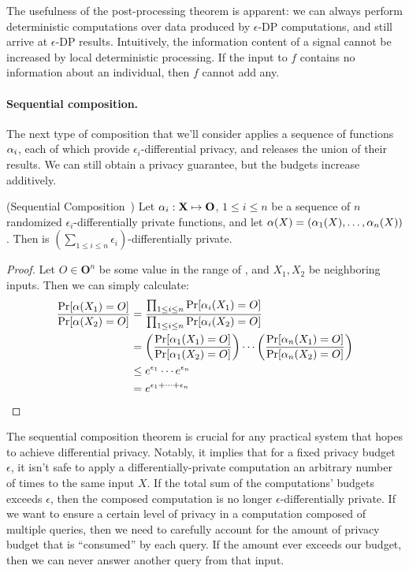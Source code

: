 \documentclass[11pt,twoside]{scrartcl}
\begin{document}
The usefulness of the post-processing theorem is apparent: we can always perform deterministic computations over data produced by $\epsilon$-DP computations, and still arrive at $\epsilon$-DP results. Intuitively, the information content of a signal cannot be increased by local deterministic processing. If the input to $f$ contains no information about an individual, then $f$ cannot add any.

\paragraph{Sequential composition.} The next type of composition that we'll consider applies a sequence of functions $\alpha_i$, each of which provide $\epsilon_i$-differential privacy, and releases the union of their results. We can still obtain a privacy guarantee, but the budgets increase additively.

\begin{theorem}{(Sequential Composition~\cite{McSherry2009})}
Let $\alpha_i : \mathbf{X} \mapsto \mathbf{O}$, $1 \le i \le n$ be a sequence of $n$ randomized $\epsilon_i$-differentially private functions, and let $\alpha(X) = (\alpha_1(X), \ldots, \alpha_n(X))$. Then \san is $(\sum_{1 \le i \le n} \epsilon_i)$-differentially private.
\end{theorem}

\begin{proof}
Let $O \in \mathbf{O}^n$ be some value in the range of \san, and $X_1, X_2$ be neighboring inputs. Then we can simply calculate:
\begin{align*}
\frac{
  \mathrm{Pr}[\alpha(X_1) = O]
}{
  \mathrm{Pr}[\alpha(X_2) = O]
}
&=
\frac{
  \prod_{1 \le i \le n} \mathrm{Pr}[\alpha_i(X_1) = O]
}{
  \prod_{1 \le i \le n} \mathrm{Pr}[\alpha_i(X_2) = O]
}
\\
&=
\left(
\frac{
  \mathrm{Pr}[\alpha_1(X_1) = O]
}{
  \mathrm{Pr}[\alpha_1(X_2) = O]
}
\right)
\cdots
\left(
\frac{
  \mathrm{Pr}[\alpha_n(X_1) = O]
}{
  \mathrm{Pr}[\alpha_n(X_2) = O]
}
\right)
\\
&\le
e^{\epsilon_1}\cdots e^{\epsilon_n}
\\
&=
e^{\epsilon_1 + \cdots + \epsilon_n}
\end{align*}
\end{proof}

The sequential composition theorem is crucial for any practical system that hopes to achieve differential privacy. Notably, it implies that for a fixed privacy budget $\epsilon$, it isn't safe to apply a differentially-private computation an arbitrary number of times to the same input $X$. If the total sum of the computations' budgets exceeds $\epsilon$, then the composed computation is no longer $\epsilon$-differentially private. If we want to ensure a certain level of privacy in a computation composed of multiple queries, then we need to carefully account for the amount of privacy budget that is ``consumed''  by each query. If the amount ever exceeds our budget, then we can never answer another query from that input.
\end{document}
